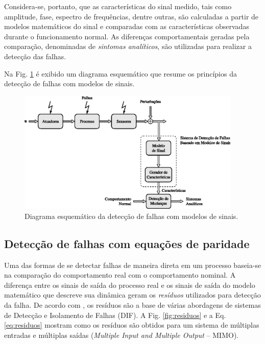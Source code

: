 Considera-se, portanto, que as características do sinal medido, tais como
amplitude, fase, espectro de frequências, dentre outras, são calculadas a partir
de modelos matemáticos do sinal e comparadas com as características observadas
durante o funcionamento normal. As diferenças comportamentais geradas pela
comparação, denominadas de {\it sintomas analíticos}, são utilizadas para
realizar a detecção das falhas.

Na Fig. \ref{fig:detec_mod_sin} é exibido um diagrama esquemático que resume os
princípios da detecção de falhas com modelos de sinais.

\begin{figure}[htb]
\centering
    \includegraphics[width=0.95\textwidth]{imgs/detec_diag/eps/detec_mod_sin}
    \caption{Diagrama esquemático da detecção de falhas com modelos de sinais.}
    \label{fig:detec_mod_sin}
\end{figure}

\subsection{Detecção de falhas com equações de paridade}
Uma das formas de se detectar falhas de maneira direta em um processo baseia-se
na comparação do comportamento real com o comportamento nominal. A diferença
entre os sinais de saída do processo real e os sinais de saída do modelo
matemático que descreve sua dinâmica geram os {\it resíduos} utilizados para
detecção da falha. De acordo com , os resíduos são a base
de várias abordagens de sistemas de Detecção e Isolamento de Falhas (DIF). A
Fig. \ref{fig:residuos} e a Eq. \ref{eq:residuos} mostram como os resíduos são
obtidos para um sistema de múltiplas entradas e múltiplas saídas ({\it Multiple
Input and Multiple Output} -- MIMO).

